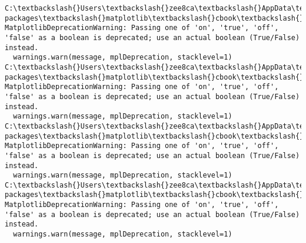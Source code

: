 \documentclass[11pt]{article}
\begin{document}
    \begin{Verbatim}[commandchars=\\\{\}]
C:\textbackslash{}Users\textbackslash{}zee8ca\textbackslash{}AppData\textbackslash{}Local\textbackslash{}Continuum\textbackslash{}anaconda3\textbackslash{}lib\textbackslash{}site-packages\textbackslash{}matplotlib\textbackslash{}cbook\textbackslash{}deprecation.py:107: MatplotlibDeprecationWarning: Passing one of 'on', 'true', 'off', 'false' as a boolean is deprecated; use an actual boolean (True/False) instead.
  warnings.warn(message, mplDeprecation, stacklevel=1)
C:\textbackslash{}Users\textbackslash{}zee8ca\textbackslash{}AppData\textbackslash{}Local\textbackslash{}Continuum\textbackslash{}anaconda3\textbackslash{}lib\textbackslash{}site-packages\textbackslash{}matplotlib\textbackslash{}cbook\textbackslash{}deprecation.py:107: MatplotlibDeprecationWarning: Passing one of 'on', 'true', 'off', 'false' as a boolean is deprecated; use an actual boolean (True/False) instead.
  warnings.warn(message, mplDeprecation, stacklevel=1)
C:\textbackslash{}Users\textbackslash{}zee8ca\textbackslash{}AppData\textbackslash{}Local\textbackslash{}Continuum\textbackslash{}anaconda3\textbackslash{}lib\textbackslash{}site-packages\textbackslash{}matplotlib\textbackslash{}cbook\textbackslash{}deprecation.py:107: MatplotlibDeprecationWarning: Passing one of 'on', 'true', 'off', 'false' as a boolean is deprecated; use an actual boolean (True/False) instead.
  warnings.warn(message, mplDeprecation, stacklevel=1)
C:\textbackslash{}Users\textbackslash{}zee8ca\textbackslash{}AppData\textbackslash{}Local\textbackslash{}Continuum\textbackslash{}anaconda3\textbackslash{}lib\textbackslash{}site-packages\textbackslash{}matplotlib\textbackslash{}cbook\textbackslash{}deprecation.py:107: MatplotlibDeprecationWarning: Passing one of 'on', 'true', 'off', 'false' as a boolean is deprecated; use an actual boolean (True/False) instead.
  warnings.warn(message, mplDeprecation, stacklevel=1)

    \end{Verbatim}

    \begin{center}
    \end{center}
    { \hspace*{\fill} \\}
    

    
    
    
    
\end{document}
